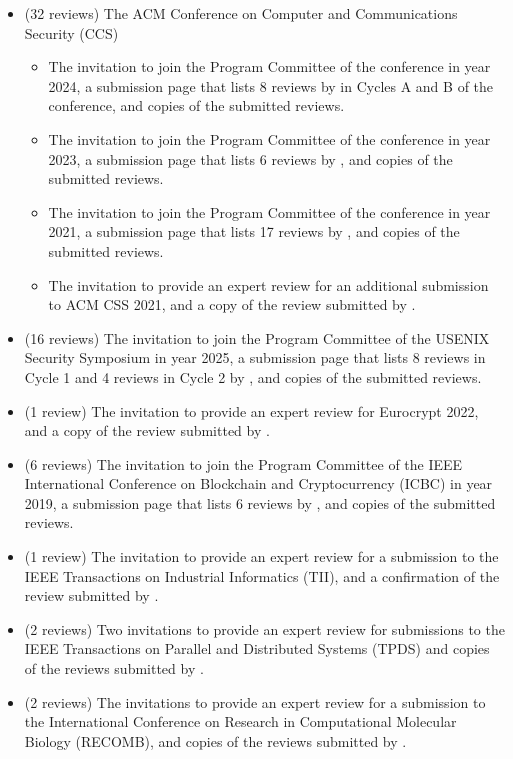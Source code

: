 \vspace{-7em}
\begin{itemize}
	\item (32 reviews) The ACM Conference on Computer and Communications Security (CCS)
	\begin{itemize}
		\item The invitation to join the Program Committee of the
		conference in year 2024, a submission page that lists 8 reviews by \dr
		in Cycles A and B of the conference, and copies of the submitted
		reviews.
		\item The invitation to join the Program Committee of the
		conference in year 2023, a submission page that lists 6 reviews by \dr,
		and copies of the submitted reviews.
		\item The invitation to join the Program Committee of the
		conference in year 2021, a submission page that lists 17 reviews by \dr,
		and copies of the submitted reviews.
		\item The invitation to provide an expert review for an additional
		submission to ACM CSS 2021, and a copy of the review submitted by \dr.
	\end{itemize}
	\item (16 reviews) The invitation to join the Program Committee of the
	USENIX Security Symposium in year 2025, a submission page that lists 8
	reviews in Cycle 1 and 4 reviews in Cycle 2 by \dr, and copies of the submitted reviews.
	\item (1 review) The invitation to provide an expert review for
	Eurocrypt 2022, and a copy of the review submitted by \dr.
	\item (6 reviews) The invitation to join the Program Committee of the
	IEEE International Conference on Blockchain and Cryptocurrency (ICBC) in
	year 2019, a submission page that lists 6 reviews by \dr, and copies of
	the submitted reviews.
	\item (1 review) The invitation to provide an expert review for a
	submission to the IEEE Transactions on Industrial Informatics (TII), and a
	confirmation of the review submitted by \dr.
	\item (2 reviews) Two invitations to provide an expert review for
	submissions to the IEEE Transactions on Parallel and Distributed Systems (TPDS)
	and copies of the reviews submitted by \dr.
	\item (2 reviews) The invitations to provide an expert review for a submission to the International Conference on Research in Computational Molecular Biology (RECOMB), and copies of the reviews submitted by \dr.

\end{itemize}
